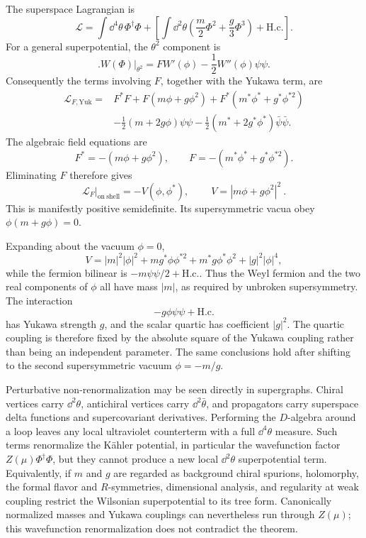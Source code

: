 \begin{enumerate}
  The superspace Lagrangian is
  \[
    \mathcal L
      =\int \dd^4\theta\,\Phi^\dagger\Phi
       +\left[\int \dd^2\theta\left(
          \frac m2\Phi^2+\frac g3\Phi^3\right)+\mathrm{H.c.}\right].
  \]
  For a general superpotential, the \(\theta^2\) component is
  \[
    \bigl.W(\Phi)\bigr|_{\theta^2}
      =F W'(\phi)-\frac12W''(\phi)\psi\psi.
  \]
  Consequently the terms involving \(F\), together with the Yukawa term,
  are
  \[
  \begin{split}
    \mathcal L_{F,\mathrm{Yuk}}={}&F^*F
      +F(m\phi+g\phi^2)+F^*(m^*\phi^*+g^*\phi^{*2})\\
      &-\frac12(m+2g\phi)\psi\psi
       -\frac12(m^*+2g^*\phi^*)\bar\psi\bar\psi .
  \end{split}
  \]
  The algebraic field equations are
  \[
    F^*=-(m\phi+g\phi^2),
    \qquad
    F=-(m^*\phi^*+g^*\phi^{*2}).
  \]
  Eliminating \(F\) therefore gives
  \[
    \mathcal L_F\big|_{\mathrm{on\ shell}}=-V(\phi,\phi^*),
    \qquad
    \boxed{\ V=|m\phi+g\phi^2|^2\ }.
  \]
  This is manifestly positive semidefinite.  Its supersymmetric vacua obey
  \(\phi(m+g\phi)=0\).

  Expanding about the vacuum \(\phi=0\),
  \[
    V=|m|^2|\phi|^2
      +m g^*\phi\phi^{*2}+m^*g\phi^*\phi^2
      +|g|^2|\phi|^4,
  \]
  while the fermion bilinear is
  \(-m\psi\psi/2+\mathrm{H.c.}\).  Thus the Weyl fermion and the two real
  components of \(\phi\) all have mass \(|m|\), as required by unbroken
  supersymmetry.  The interaction
  \[
    -g\phi\psi\psi+\mathrm{H.c.}
  \]
  has Yukawa strength \(g\), and the scalar quartic has coefficient
  \(|g|^2\).  The quartic coupling is therefore fixed by the absolute square
  of the Yukawa coupling rather than being an independent parameter.  The
  same conclusions hold after shifting to the second supersymmetric vacuum
  \(\phi=-m/g\).

  Perturbative non-renormalization may be seen directly in supergraphs.
  Chiral vertices carry \(\dd^2\theta\), antichiral vertices carry
  \(\dd^2\bar\theta\), and propagators carry superspace delta functions and
  supercovariant derivatives.  Performing the \(D\)-algebra around a loop
  leaves any local ultraviolet counterterm with a full \(\dd^4\theta\) measure.
  Such terms renormalize the K\"ahler potential, in particular the
  wavefunction factor \(Z(\mu)\Phi^\dagger\Phi\), but they cannot produce a
  new local \(\dd^2\theta\) superpotential term.  Equivalently, if \(m\) and
  \(g\) are regarded as background chiral spurions, holomorphy, the formal
  flavor and \(R\)-symmetries, dimensional analysis, and regularity at weak
  coupling restrict the Wilsonian superpotential to its tree form.
  Canonically normalized masses and Yukawa couplings can nevertheless run
  through \(Z(\mu)\); this wavefunction renormalization does not contradict
  the theorem.


\end{enumerate}
